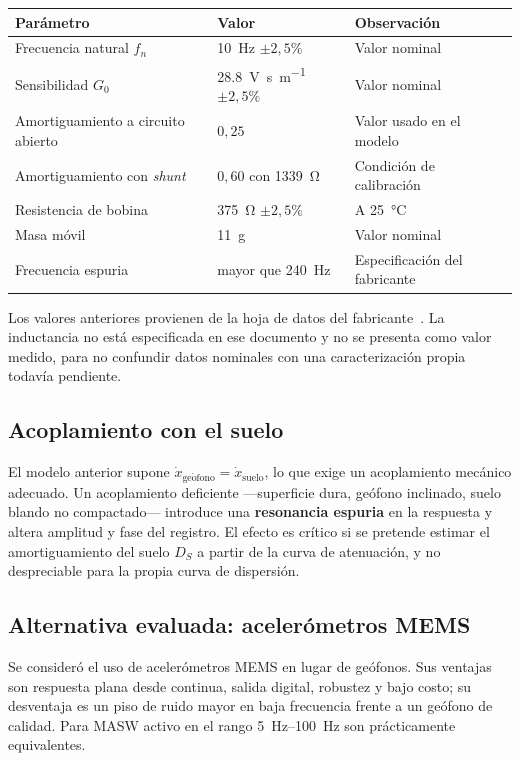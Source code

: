 \begin{center}\footnotesize
\begin{tabular}{@{}lll@{}}
\toprule
Par\'ametro & Valor & Observaci\'on \\
\midrule
Frecuencia natural $f_n$ & \SI{10}{\hertz} $\pm2{,}5\%$ & Valor nominal \\
Sensibilidad $G_0$ & \SI{28.8}{\volt\second\per\meter} $\pm2{,}5\%$ & Valor nominal \\
Amortiguamiento a circuito abierto & $0{,}25$ & Valor usado en el modelo \\
Amortiguamiento con \emph{shunt} & $0{,}60$ con \SI{1339}{\ohm} & Condici\'on de calibraci\'on \\
Resistencia de bobina & \SI{375}{\ohm} $\pm2{,}5\%$ & A \SI{25}{\celsius} \\
Masa m\'ovil & \SI{11}{\gram} & Valor nominal \\
Frecuencia espuria & mayor que \SI{240}{\hertz} & Especificaci\'on del fabricante \\
\bottomrule
\end{tabular}
\end{center}

Los valores anteriores provienen de la hoja de datos del fabricante~\cite{SM24}. La
inductancia no est\'a especificada en ese documento y no se presenta como valor medido,
para no confundir datos nominales con una caracterizaci\'on propia todav\'ia pendiente.

\subsection{Acoplamiento con el suelo}

El modelo anterior supone $\dot{x}_{\mathrm{ge\acute{o}fono}}=\dot{x}_{\mathrm{suelo}}$, lo
que exige un acoplamiento mec\'anico adecuado. Un acoplamiento deficiente ---superficie
dura, ge\'ofono inclinado, suelo blando no compactado--- introduce una
\textbf{resonancia espuria} en la respuesta y altera amplitud y fase del registro. El
efecto es cr\'itico si se pretende estimar el amortiguamiento del suelo $D_S$ a partir de
la curva de atenuaci\'on, y no despreciable para la propia curva de dispersi\'on.

\subsection{Alternativa evaluada: aceler\'ometros MEMS}

Se consider\'o el uso de aceler\'ometros MEMS en lugar de ge\'ofonos. Sus ventajas son
respuesta plana desde continua, salida digital, robustez y bajo costo; su desventaja es
un piso de ruido mayor en baja frecuencia frente a un ge\'ofono de calidad. Para MASW
activo en el rango \SIrange{5}{100}{\hertz} son pr\'acticamente equivalentes.


